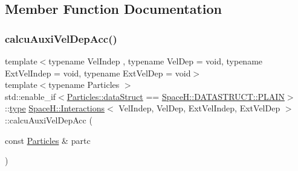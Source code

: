 \subsection{Member Function Documentation}
\mbox{\label{class_space_h_1_1_interactions_a99436e576da0455cd4ab795e3ccbc19a}} 
\subsubsection{\texorpdfstring{calcu\+Auxi\+Vel\+Dep\+Acc()}{calcuAuxiVelDepAcc()}\hspace{0.1cm}{\footnotesize\ttfamily [1/2]}}
{\footnotesize\ttfamily template$<$typename Vel\+Indep , typename Vel\+Dep  = void, typename Ext\+Vel\+Indep  = void, typename Ext\+Vel\+Dep  = void$>$ \\
template$<$typename Particles $>$ \\
std\+::enable\+\_\+if$<$\mbox{\hyperlink{class_space_h_1_1_vel_indep_particles_a066cbb08e0d444c27e2f71c30092e13f}{Particles\+::data\+Struct}} == \mbox{\hyperlink{namespace_space_h_a4782f089179a3c269891f02482b072dfaf62eb0bf5e5c72e80983fbbac1cb70e5}{Space\+H\+::\+D\+A\+T\+A\+S\+T\+R\+U\+C\+T\+::\+P\+L\+A\+IN}}$>$\+::\mbox{\hyperlink{class_space_h_1_1_interactions_aa45fc9367bfa0b8693700525ffa2655f}{type}} \mbox{\hyperlink{class_space_h_1_1_interactions}{Space\+H\+::\+Interactions}}$<$ Vel\+Indep, Vel\+Dep, Ext\+Vel\+Indep, Ext\+Vel\+Dep $>$\+::calcu\+Auxi\+Vel\+Dep\+Acc (\begin{DoxyParamCaption}\item[{const \mbox{\hyperlink{struct_space_h_1_1_particles}{Particles}} \&}]{partc }\end{DoxyParamCaption})\hspace{0.3cm}{\ttfamily [inline]}}

